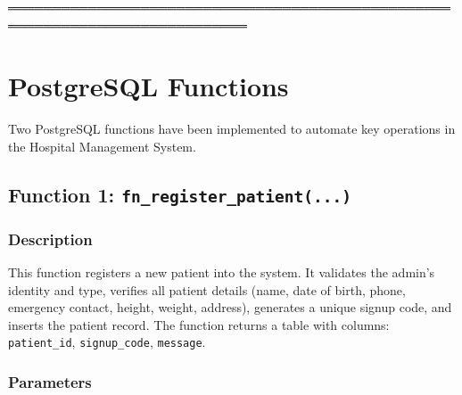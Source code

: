 \documentclass{article}
\begin{document}
═════════════════════════════════════════════════════════════════════════════
\section{PostgreSQL Functions}


Two PostgreSQL functions have been implemented to automate key operations in the Hospital Management System.

\subsection{Function 1: \texttt{fn\_register\_patient(...)}}

\subsubsection{Description}
This function registers a new patient into the system. It validates the admin's identity and type, verifies all patient details (name, date of birth, phone, emergency contact, height, weight, address), generates a unique signup code, and inserts the patient record. The function returns a table with columns: \texttt{patient\_id}, \texttt{signup\_code}, \texttt{message}.

\subsubsection{Parameters}
\end{document}
